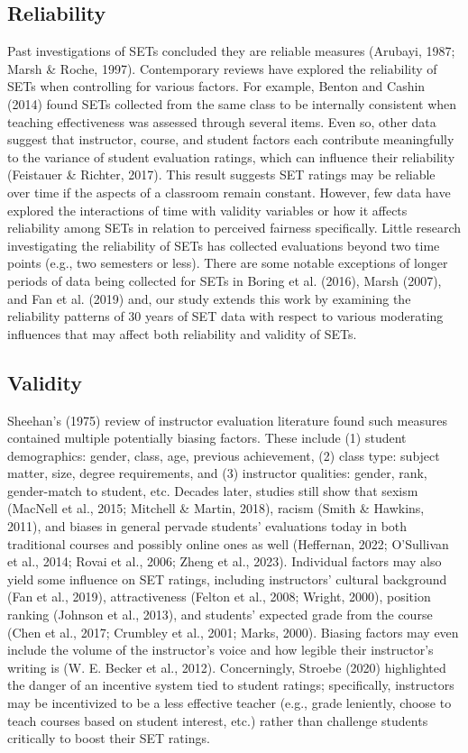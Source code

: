 \documentclass[
  man,mask]{apa7}
\begin{document}
\subsection{Reliability}\label{reliability}

Past investigations of SETs concluded they are reliable measures
(Arubayi, 1987; Marsh \& Roche, 1997). Contemporary reviews have explored the
reliability of SETs when controlling for various factors. For example,
Benton and Cashin (2014) found SETs collected from the same class to be internally
consistent when teaching effectiveness was assessed through several
items. Even so, other data suggest that instructor, course, and student
factors each contribute meaningfully to the variance of student
evaluation ratings, which can influence their reliability
(Feistauer \& Richter, 2017). This result suggests SET ratings may be reliable over
time if the aspects of a classroom remain constant. However, few data
have explored the interactions of time with validity variables or how it
affects reliability among SETs in relation to perceived fairness
specifically. Little research investigating the reliability of SETs has
collected evaluations beyond two time points (e.g., two semesters or
less). There are some notable exceptions of longer periods of data being
collected for SETs in Boring et al. (2016), Marsh (2007), and Fan et al. (2019) and, our study extends this work by examining the reliability patterns of 30 years of SET data with respect to various moderating influences that may affect both reliability and validity of SETs.

\subsection{Validity}\label{validity}

Sheehan's (1975) review of instructor evaluation literature found such measures contained multiple potentially biasing factors. These include (1) student demographics: gender, class, age,
previous achievement, (2) class type: subject matter, size, degree
requirements, and (3) instructor qualities: gender, rank, gender-match to
student, etc. Decades later, studies still show that sexism
(MacNell et al., 2015; Mitchell \& Martin, 2018), racism (Smith \& Hawkins, 2011), and biases in general
pervade students' evaluations today in both traditional courses and
possibly online ones as well (Heffernan, 2022; O'Sullivan et al., 2014; Rovai et al., 2006; Zheng et al., 2023). Individual factors may also yield some influence on SET
ratings, including instructors' cultural background (Fan et al., 2019),
attractiveness (Felton et al., 2008; Wright, 2000), position ranking
(Johnson et al., 2013), and students' expected grade from the course (Chen et al., 2017; Crumbley et al., 2001; Marks, 2000). Biasing factors may even include the volume
of the instructor's voice and how legible their instructor's writing is
(W. E. Becker et al., 2012). Concerningly, Stroebe (2020) highlighted the danger of an incentive system tied to student ratings; specifically, instructors may be incentivized to be a less effective teacher (e.g., grade leniently, choose to teach courses based on student interest, etc.) rather than challenge students critically to boost their SET ratings.
\end{document}
